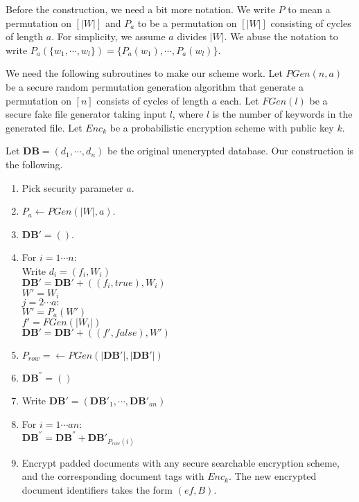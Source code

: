 \documentclass{article}
\newcommand{\db}{\textbf{DB}}
\newcommand{\doc}{d}
\newcommand{\file}{f}
\newcommand{\efile}{ef}
\newcommand{\kwset}{W}
\newcommand{\kw}{w}
\newcommand{\boolean}{B}
\newcommand{\enc}{Enc}
\begin{document}
Before the construction, we need a bit more notation. We write $P$ to mean a permutation on $[|\kwset|]$ and $P_a$ to be a permutation on $[|\kwset|]$ consisting of cycles of length $a$. For simplicity, we assume $a$ divides $|\kwset|$. We abuse the notation to write $P_a(\{\kw_1, \cdots, \kw_l\}) = \{P_a(\kw_1), \cdots, P_a(\kw_l)\}$.

We need the following subroutines to make our scheme work. Let $PGen(n, a)$ be a secure random permutation generation algorithm that generate a permutation on $[n]$ consists of cycles of length $a$ each. Let $FGen(l)$ be a secure fake file generator taking input $l$, where $l$ is the number of keywords in the generated file. Let $\enc_k$ be a probabilistic encryption scheme with public key $k$.

Let $\db = (\doc_1, \cdots, \doc_n)$ be the original unencrypted database. Our construction is the following.
\begin{enumerate}
	\item Pick security parameter $a$.
	\item $P_a \leftarrow PGen(|\kwset|, a)$.
	\item $\db' = ()$.
	\item For $i = 1 \cdots n$:\\
		\hspace*{2em} Write $\doc_i = (\file_i, \kwset_i)$ \\
		\hspace*{2em} $\db' = \db' + ((\file_i, true), \kwset_i)$ \\
		\hspace*{2em} $\kwset' = \kwset_i$ \\
		\hspace*{2em} $j = 2 \cdots a:$ \\
		\hspace*{4em}	$\kwset' = P_a(\kwset')$ \\
		\hspace*{4em}	$f' = FGen(|\kwset_i|)$ \\
		\hspace*{4em}	$\db' = \db' + ((\file', false), \kwset')$
	\item $P_{row} = \leftarrow PGen(|\db'|, |\db'|)$
	\item $\db^{''} = ()$
	\item Write $\db' = (\db'_1, \cdots, \db'_{an})$
	\item For $i = 1 \cdots an$:\\
		\hspace*{2em} $\db^{''} = \db^{''} + \db'_{P_{row}(i)}$
	\item Encrypt padded documents with any secure searchable encryption scheme, and the corresponding document tags with $\enc_k$. The new encrypted document identifiers takes the form $(\efile, \boolean)$.
\end{enumerate}
\end{document}
